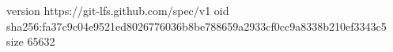 version https://git-lfs.github.com/spec/v1
oid sha256:fa37c9c04e9521ed8026776036b8be788659a2933cf0cc9a8338b210ef3343c5
size 65632
